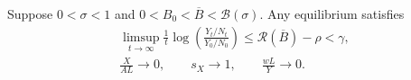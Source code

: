 %
%

\begin{proposition}
\label{prop:rewrite-low-cap-complements}
Suppose $0<\sigma<1$ and $0<B_0<\overline B<\mathcal B(\sigma)$.
Any equilibrium satisfies
\begin{gather*}
 \limsup_{t\to\infty}\frac1t
 \log\left(\frac{Y_t/N_t}{Y_0/N_0}\right)
 \leq\mathcal R(\overline B)-\rho<\gamma,\\
 \frac{X}{AL}\to0,\qquad s_X\to1,\qquad \frac{wL}{Y}\to0.
\end{gather*}
\end{proposition}


